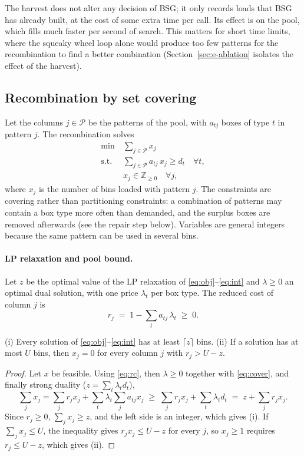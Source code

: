The harvest does not alter any decision of BSG; it only records loads that BSG has already built,
at the cost of some extra time per call. Its effect is on the pool, which fills much faster per
second of search. This matters for short time limits, where the squeaky wheel loop alone would
produce too few patterns for the recombination to find a better combination
(Section~\ref{sec:e-ablation} isolates the effect of the harvest).

\subsection{Recombination by set covering}
\label{sec:m-cover}

Let the columns $j\in\mathcal{P}$ be the patterns of the pool, with $a_{tj}$ boxes of type $t$ in
pattern $j$. The recombination solves
\begin{align}
\min\ & \sum_{j\in\mathcal{P}} x_j \label{eq:obj}\\
\text{s.t.}\ & \sum_{j\in\mathcal{P}} a_{tj}\,x_j \ge d_t \quad \forall t, \label{eq:cover}\\
& x_j\in\mathbb{Z}_{\ge 0}\quad\forall j, \label{eq:int}
\end{align}
where $x_j$ is the number of bins loaded with pattern $j$. The constraints are covering rather than
partitioning constraints: a combination of patterns may contain a box type more often than
demanded, and the surplus boxes are removed afterwards (see the repair step below). Variables are
general integers because the same pattern can be used in several bins.

\paragraph{LP relaxation and pool bound.}
Let $z$ be the optimal value of the LP relaxation of \eqref{eq:obj}--\eqref{eq:int} and
$\lambda\ge 0$ an optimal dual solution, with one price $\lambda_t$ per box type. The reduced
cost of column $j$ is
\begin{equation}
\label{eq:rc}
r_j \;=\; 1-\sum_t a_{tj}\,\lambda_t \;\ge\; 0 .
\end{equation}

\begin{proposition}
\label{prop:fix}
(i) Every solution of \eqref{eq:obj}--\eqref{eq:int} has at least $\lceil z\rceil$ bins.
(ii) If a solution has at most $U$ bins, then $x_j=0$ for every column $j$ with $r_j>U-z$.
\end{proposition}
\begin{proof}
Let $x$ be feasible. Using \eqref{eq:rc}, then $\lambda\ge 0$ together with \eqref{eq:cover}, and
finally strong duality ($z=\sum_t\lambda_t d_t$),
\[
\sum_j x_j=\sum_j r_j x_j+\sum_t\lambda_t\sum_j a_{tj}x_j\;\ge\;\sum_j r_j x_j+\sum_t\lambda_t d_t
\;=\;z+\sum_j r_j x_j .
\]
Since $r_j\ge 0$, $\sum_j x_j\ge z$, and the left side is an integer, which gives (i). If
$\sum_j x_j\le U$, the inequality gives $r_jx_j\le U-z$ for every $j$, so $x_j\ge 1$ requires
$r_j\le U-z$, which gives (ii).
\end{proof}


